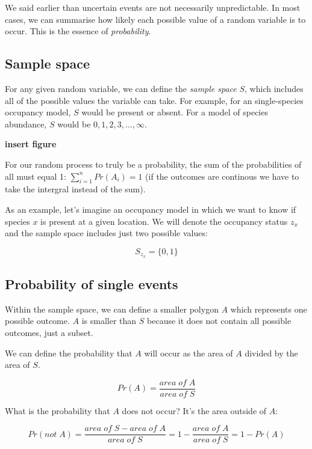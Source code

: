 \documentclass[]{article}
\begin{document}
We said earlier than uncertain events are not necessarily unpredictable.
In most cases, we can summarise how likely each possible value of a
random variable is to occur. This is the essence of \emph{probability}.

\hypertarget{sample-space}{%
\subsection{Sample space}\label{sample-space}}

For any given random variable, we can define the \emph{sample space}
\(S\), which includes all of the possible values the variable can take.
For example, for an single-species occupancy model, \(S\) would be
present or absent. For a model of species abundance, \(S\) would be
\({0,1,2,3,...,\infty}\).

\textbf{insert figure}

For our random process to truly be a probability, the sum of the
probabilities of all must equal 1: \(\sum_{i=1}^n Pr(A_i) = 1\) (if the
outcomes are continous we have to take the intergral instead of the
sum).

As an example, let's imagine an occupancy model in which we want to know
if species \(x\) is present at a given location. We will denote the
occupancy status \(z_x\) and the sample space includes just two possible
values:

\[S_{z_x}=\{0, 1\}\]

\hypertarget{probability-of-single-events}{%
\subsection{Probability of single
events}\label{probability-of-single-events}}

Within the sample space, we can define a smaller polygon \(A\) which
represents one possible outcome. \(A\) is smaller than \(S\) because it
does not contain all possible outcomes, just a subset.

We can define the probability that \(A\) will occur as the area of \(A\)
divided by the area of \(S\).

\[Pr(A) = \frac{area\; of\; A}{area\; of \;S}\]

What is the probability that \(A\) does not occur? It's the area outside
of \(A\):

\[Pr(not \; A) = \frac{area\; of \;S - area\; of\; A}{area\; of \;S} = 1 - \frac{area\; of\; A}{area\; of \;S} = 1 - Pr(A)\]
\end{document}
